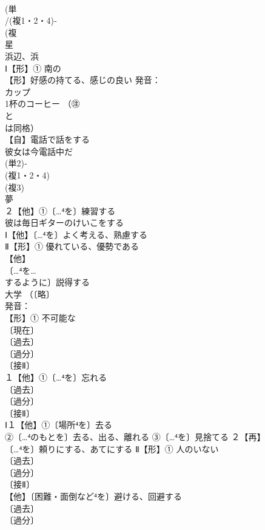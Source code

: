 \documentclass[8pt]{extreport}
\begin{document}
\begin{CJK}{UTF8}{min}
\\	(単
\\	/(複1・2・4)‐
\\	(複
\\	星 
\\	浜辺、浜 
\\	Ⅰ【形】① 南の 
\\	【形】好感の持てる、感じの良い 発音：
\\	カップ 
\\	1杯のコーヒー （㊟
\\	と
\\	は同格） 
\\	【自】電話で話をする 
\\	彼女は今電話中だ
\\	(単2)‐
\\	(複1・2・4)
\\	(複3)
\\	夢 
\\	２【他】①〔…⁴を〕練習する 
\\	彼は毎日ギターのけいこをする
\\	Ⅰ【他】〔…⁴を〕よく考える、熟慮する 
\\	Ⅱ【形】① 優れている、優勢である 
\\	【他】
\\	〔…⁴を…
\\	するように〕説得する 
\\	大学 （〔略〕
\\	発音：
\\	【形】① 不可能な 
\\	〔現在〕
\\	〔過去〕
\\	〔過分〕
\\	〔接Ⅱ〕
\\	１【他】①〔…⁴を〕忘れる 
\\	〔過去〕
\\	〔過分〕
\\	〔接Ⅱ〕
\\	Ⅰ１【他】①〔場所⁴を〕去る 
\\	②〔…⁴のもとを〕去る、出る、離れる ③〔…⁴を〕見捨てる ２【再】
\\	〔…⁴を〕頼りにする、あてにする Ⅱ【形】① 人のいない
\\	〔過去〕
\\	〔過分〕
\\	〔接Ⅱ〕
\\	【他】〔困難・面倒など⁴を〕避ける、回避する 
\\	〔過去〕
\\	〔過分〕

\end{CJK}
\end{document}
